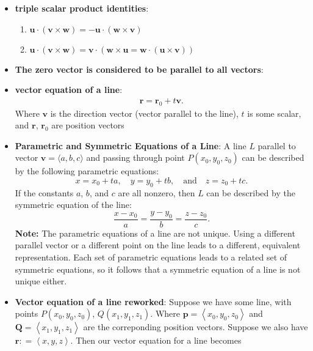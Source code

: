 \documentclass{report}
\begin{document}
\begin{itemize}
    \item \textbf{triple scalar product identities}: 
        \begin{enumerate}[label=(\alph*)]
            \item $\mathbf{u} \cdot (\mathbf{v} \times \mathbf{w}) = -\mathbf{u} \cdot (\mathbf{w} \times \mathbf{v})$
            \item $\mathbf{u} \cdot (\mathbf{v} \times \mathbf{w}) = \mathbf{v} \cdot (\mathbf{w} \times \mathbf{u} = \mathbf{w} \cdot (\mathbf{u} \times \mathbf{v}))$
        \end{enumerate}
    \item \textbf{The zero vector is considered to be parallel to all vectors}:
    \item \textbf{vector equation of a line}:
        \begin{align*}
            \mathbf{r} = \mathbf{r}_{0} + t\mathbf{v} 
        .\end{align*}
        Where $\mathbf{v}$ is the direction vector (vector parallel to the line), $t$ is some scalar, and $\mathbf{r}$, $\mathbf{r}_{0}$ are position vectors
    \item \textbf{Parametric and Symmetric Equations of a Line}:
        A line $L$ parallel to vector $\mathbf{v}=\langle a,b,c \rangle$ and passing through point $P(x_0,y_0,z_0)$ can be described by the following parametric equations:
        \[
            x=x_0+ta, \quad y=y_0+tb, \quad \text{and} \quad z=z_0+tc.
        \]
        If the constants $a$, $b$, and $c$ are all nonzero, then $L$ can be described by the symmetric equation of the line:
        \[
            \frac{x-x_0}{a} = \frac{y-y_0}{b} = \frac{z-z_0}{c}.
        \]
        \bigbreak \noindent 
        \textbf{Note:} The parametric equations of a line are not unique. Using a different parallel vector or a different point on the line leads to a different, equivalent representation. Each set of parametric equations leads to a related set of symmetric equations, so it follows that a symmetric equation of a line is not unique either.
    \item \textbf{Vector equation of a line reworked}: Suppose we have some line, with points $P(x_{0}, y_{0}, z_{0})$, $Q(x_{1}, y_{1}, z_{1})$. Where $\mathbf{p} = \left\langle x_{0}, y_{0}, z_{0}\right\rangle $ and $\mathbf{Q} = \left\langle x_{1}, y_{1}, z_{1}\right\rangle $ are the correponding position vectors. Suppose we also have $\mathbf{r}: = \left\langle x,y,z \right\rangle $. Then our vector equation for a line becomes 
        \begin{align*}

\end{align*}
\end{itemize}
\end{document}
